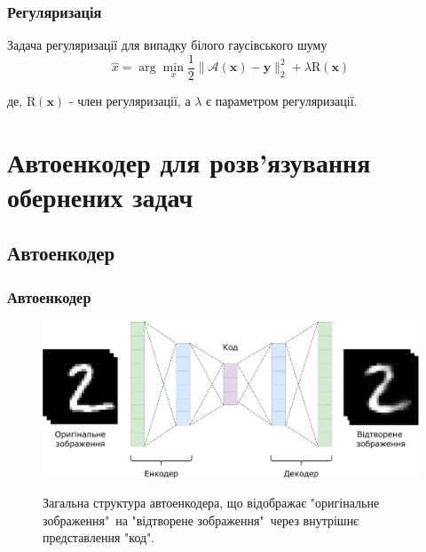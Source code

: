 \documentclass{beamer}
\newcounter{e}
\begin{document}
	\begin{frame}
		\frametitle{Регуляризація}
		
		\begin{block}{Задача регуляризації для випадку білого гаусівського шуму }
			\begin{equation}
				\label{eq:MAP-avgn}
				\hat{x}=\arg \min_{x} 	\frac{1}{2}\|\mathcal{A}(\boldsymbol{x})-\boldsymbol{y}\|_{2}^{2}+\lambda 	\mathrm{R}(\boldsymbol{x})
			\end{equation}
		\end{block}
		де, $\mathrm{R}(\boldsymbol{x})$ - член регуляризації, а $\lambda$ є параметром регуляризації.
	\end{frame}
	\section{Автоенкодер для розв'язування обернених задач}
	\subsection{Автоенкодер}
	\begin{frame}
		\frametitle{Автоенкодер}
		
		\begin{figure}[H]
			\centering
			\includegraphics[width=1\textwidth]{../resources/autoencoder.pdf}
			\label{fig:autoencoder}
			\caption{Загальна структура автоенкодера, що відображає "оригінальне зображення"\ на "відтворене зображення"\ через внутрішнє представлення "код". }
		\end{figure}
	\end{frame}
\end{document}
